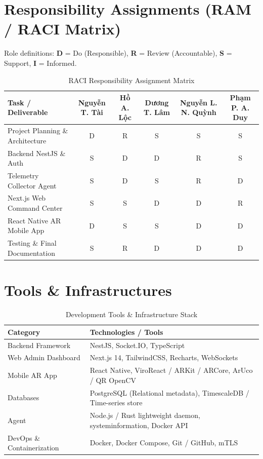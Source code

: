 \section{Responsibility Assignments (RAM / RACI Matrix)}
Role definitions: \textbf{D} = Do (Responsible), \textbf{R} = Review (Accountable), \textbf{S} = Support, \textbf{I} = Informed.

\begin{table}[H]
    \centering
    \caption{RACI Responsibility Assignment Matrix}
    \begin{tabular}{|p{6cm}|c|c|c|c|c|}
        \hline
        \textbf{Task / Deliverable} & \textbf{Nguyễn T. Tài} & \textbf{Hồ A. Lộc} & \textbf{Dương T. Lâm} & \textbf{Nguyễn L. N. Quỳnh} & \textbf{Phạm P. A. Duy} \\ \hline
        Project Planning \& Architecture & D & R & S & S & S \\ \hline
        Backend NestJS \& Auth & S & D & D & R & S \\ \hline
        Telemetry Collector Agent & S & D & S & R & D \\ \hline
        Next.js Web Command Center & S & S & D & D & R \\ \hline
        React Native AR Mobile App & D & S & S & D & D \\ \hline
        Testing \& Final Documentation & S & R & D & D & D \\ \hline
    \end{tabular}
\end{table}

\section{Tools \& Infrastructures}
\begin{table}[H]
    \centering
    \caption{Development Tools \& Infrastructure Stack}
    \begin{tabular}{|l|l|}
        \hline
        \textbf{Category} & \textbf{Technologies / Tools} \\ \hline
        Backend Framework & NestJS, Socket.IO, TypeScript \\ \hline
        Web Admin Dashboard & Next.js 14, TailwindCSS, Recharts, WebSockets \\ \hline
        Mobile AR App & React Native, ViroReact / ARKit / ARCore, ArUco / QR OpenCV \\ \hline
        Databases & PostgreSQL (Relational metadata), TimescaleDB / Time-series store \\ \hline
        Agent & Node.js / Rust lightweight daemon, systeminformation, Docker API \\ \hline
        DevOps \& Containerization & Docker, Docker Compose, Git / GitHub, mTLS \\ \hline
    \end{tabular}
\end{table}
